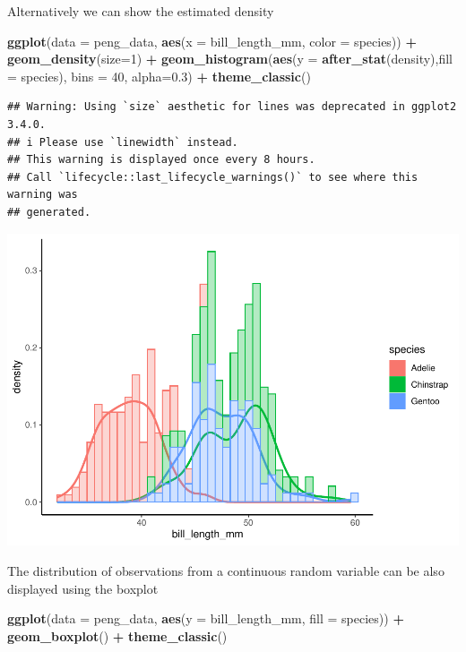 \documentclass[
]{article}
\newenvironment{Shaded}{\begin{snugshade}}{\end{snugshade}}
\newcommand{\AttributeTok}[1]{\textcolor[rgb]{0.13,0.29,0.53}{#1}}
\newcommand{\DecValTok}[1]{\textcolor[rgb]{0.00,0.00,0.81}{#1}}
\newcommand{\FloatTok}[1]{\textcolor[rgb]{0.00,0.00,0.81}{#1}}
\newcommand{\FunctionTok}[1]{\textcolor[rgb]{0.13,0.29,0.53}{\textbf{#1}}}
\newcommand{\NormalTok}[1]{#1}
\newcommand{\SpecialCharTok}[1]{\textcolor[rgb]{0.81,0.36,0.00}{\textbf{#1}}}
\begin{document}
Alternatively we can show the estimated density

\begin{Shaded}
\begin{Highlighting}[]
\FunctionTok{ggplot}\NormalTok{(}\AttributeTok{data =}\NormalTok{ peng\_data, }\FunctionTok{aes}\NormalTok{(}\AttributeTok{x =}\NormalTok{ bill\_length\_mm, }\AttributeTok{color =}\NormalTok{ species)) }\SpecialCharTok{+} 
  \FunctionTok{geom\_density}\NormalTok{(}\AttributeTok{size=}\DecValTok{1}\NormalTok{) }\SpecialCharTok{+}
  \FunctionTok{geom\_histogram}\NormalTok{(}\FunctionTok{aes}\NormalTok{(}\AttributeTok{y =} \FunctionTok{after\_stat}\NormalTok{(density),}\AttributeTok{fill =}\NormalTok{  species), }\AttributeTok{bins =} \DecValTok{40}\NormalTok{, }\AttributeTok{alpha=}\FloatTok{0.3}\NormalTok{) }\SpecialCharTok{+}
  \FunctionTok{theme\_classic}\NormalTok{()}
\end{Highlighting}
\end{Shaded}

\begin{verbatim}
## Warning: Using `size` aesthetic for lines was deprecated in ggplot2 3.4.0.
## i Please use `linewidth` instead.
## This warning is displayed once every 8 hours.
## Call `lifecycle::last_lifecycle_warnings()` to see where this warning was
## generated.
\end{verbatim}

\includegraphics{EDA_files/figure-latex/unnamed-chunk-31-1.pdf}

The distribution of observations from a continuous random variable can
be also displayed using the boxplot

\begin{Shaded}
\begin{Highlighting}[]
\FunctionTok{ggplot}\NormalTok{(}\AttributeTok{data =}\NormalTok{ peng\_data, }\FunctionTok{aes}\NormalTok{(}\AttributeTok{y =}\NormalTok{ bill\_length\_mm, }\AttributeTok{fill =}\NormalTok{ species)) }\SpecialCharTok{+} 
  \FunctionTok{geom\_boxplot}\NormalTok{() }\SpecialCharTok{+}
  \FunctionTok{theme\_classic}\NormalTok{()}
\end{Highlighting}
\end{Shaded}
\end{document}
